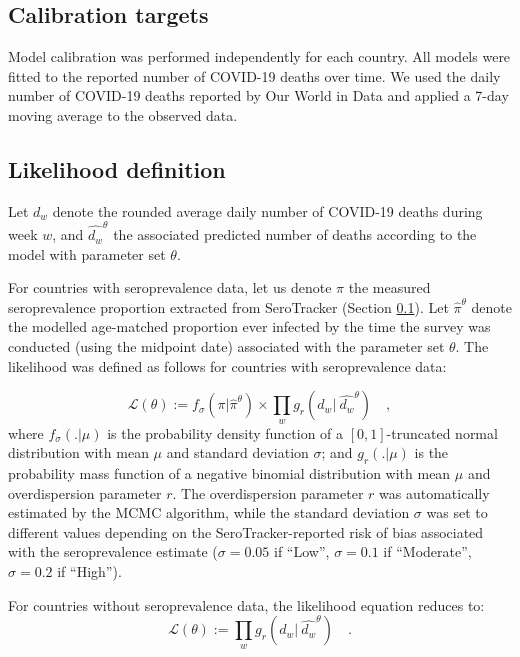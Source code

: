 \subsection{Calibration targets}
\label{targets}
Model calibration was performed independently for each country. All models were fitted to the reported number of COVID-19 deaths over time.
We used the daily number of COVID-19 deaths reported by Our World in Data and applied a 7-day moving average to the observed data. 



\subsection{Likelihood definition}
\label{likelihood}
Let $d_w$ denote the rounded average daily number of COVID-19 deaths during week $w$, and $\hat{d_w}^\theta$ 
the associated predicted number of deaths according to the model with parameter set $\theta$. 

For countries with seroprevalence data, let us denote $\pi$ the measured seroprevalence proportion extracted from SeroTracker (Section \ref{targets}). 
Let $\hat{\pi}^\theta$ denote the modelled age-matched proportion ever infected by the time the survey was conducted (using the midpoint date) 
associated with the parameter set $\theta$. 
The likelihood was defined as follows for countries with seroprevalence data:

\begin{equation}
    \label{eq:likelihood}
    \mathcal{L}(\theta) := f_{\sigma}(\pi | \hat{\pi}^\theta) \times \prod_w g_r(d_w | \:\hat{d_w}^\theta) \quad ,
\end{equation}
where $f_{\sigma}( . | \mu )$ is the probability density function of a $[0, 1]$-truncated normal distribution with mean $\mu$ and standard deviation $\sigma$; and 
$g_r(. | \mu)$ is the probability mass function of a negative binomial distribution with mean $\mu$ and 
overdispersion parameter $r$. The overdispersion parameter $r$ was automatically estimated by the MCMC algorithm, while the standard deviation $\sigma$ was set to different 
values depending on the SeroTracker-reported risk of bias associated with the seroprevalence estimate ($\sigma=0.05$ if ``Low'', $\sigma=0.1$ if ``Moderate'', $\sigma=0.2$ if ``High''). 

For countries without seroprevalence data, the likelihood equation reduces to:
\begin{equation}
    \label{eq:likelihood_nosero}
    \mathcal{L}(\theta) := \prod_w g_r(d_w | \:\hat{d_w}^\theta) \quad.
\end{equation}

